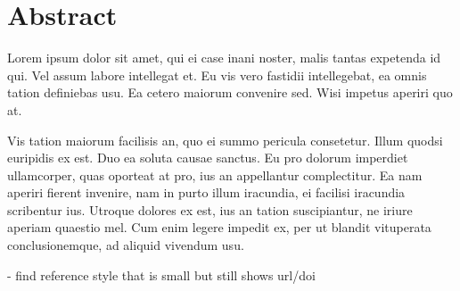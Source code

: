 \section*{Abstract}

Lorem ipsum dolor sit amet, qui ei case inani noster, malis tantas expetenda id qui. Vel assum labore intellegat et. Eu vis vero fastidii intellegebat, ea omnis tation definiebas usu. Ea cetero maiorum convenire sed. Wisi impetus aperiri quo at.

Vis tation maiorum facilisis an, quo ei summo pericula consetetur. Illum quodsi euripidis ex est. Duo ea soluta causae sanctus. Eu pro dolorum imperdiet ullamcorper, quas oporteat at pro, ius an appellantur complectitur. Ea nam aperiri fierent invenire, nam in purto illum iracundia, ei facilisi iracundia scribentur ius. Utroque dolores ex est, ius an tation suscipiantur, ne iriure aperiam quaestio mel. Cum enim legere impedit ex, per ut blandit vituperata conclusionemque, ad aliquid vivendum usu.
\newline

- find reference style that is small but still shows url/doi
